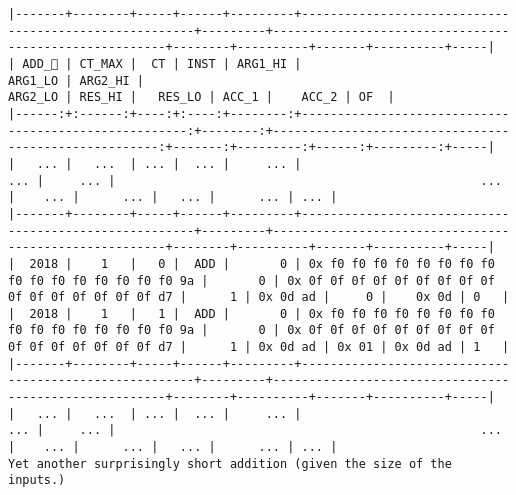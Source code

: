 \documentclass[varwidth=\maxdimen,margin=0.5cm,multi={verbatim}]{standalone}
\begin{document}
\begin{verbatim}
|-------+--------+-----+------+---------+-------------------------------------------------------+---------+-------------------------------------------------------+--------+----------+-------+----------+-----|
| ADD_ | CT_MAX |  CT | INST | ARG1_HI |                                               ARG1_LO | ARG2_HI |                                               ARG2_LO | RES_HI |   RES_LO | ACC_1 |    ACC_2 | OF  |
|------:+:------:+----:+:----:+--------:+------------------------------------------------------:+--------:+------------------------------------------------------:+-------:+---------:+------:+---------:+-----|
|   ... |   ...  | ... |  ... |     ... |                                                   ... |     ... |                                                   ... |    ... |      ... |   ... |      ... | ... |
|-------+--------+-----+------+---------+-------------------------------------------------------+---------+-------------------------------------------------------+--------+----------+-------+----------+-----|
|  2018 |    1   |   0 |  ADD |       0 | 0x f0 f0 f0 f0 f0 f0 f0 f0 f0 f0 f0 f0 f0 f0 f0 f0 9a |       0 | 0x 0f 0f 0f 0f 0f 0f 0f 0f 0f 0f 0f 0f 0f 0f 0f 0f d7 |      1 | 0x 0d ad |     0 |    0x 0d | 0   |
|  2018 |    1   |   1 |  ADD |       0 | 0x f0 f0 f0 f0 f0 f0 f0 f0 f0 f0 f0 f0 f0 f0 f0 f0 9a |       0 | 0x 0f 0f 0f 0f 0f 0f 0f 0f 0f 0f 0f 0f 0f 0f 0f 0f d7 |      1 | 0x 0d ad | 0x 01 | 0x 0d ad | 1   |
|-------+--------+-----+------+---------+-------------------------------------------------------+---------+-------------------------------------------------------+--------+----------+-------+----------+-----|
|   ... |   ...  | ... |  ... |     ... |                                                   ... |     ... |                                                   ... |    ... |      ... |   ... |      ... | ... |
Yet another surprisingly short addition (given the size of the inputs.)
\end{verbatim}
\end{document}
